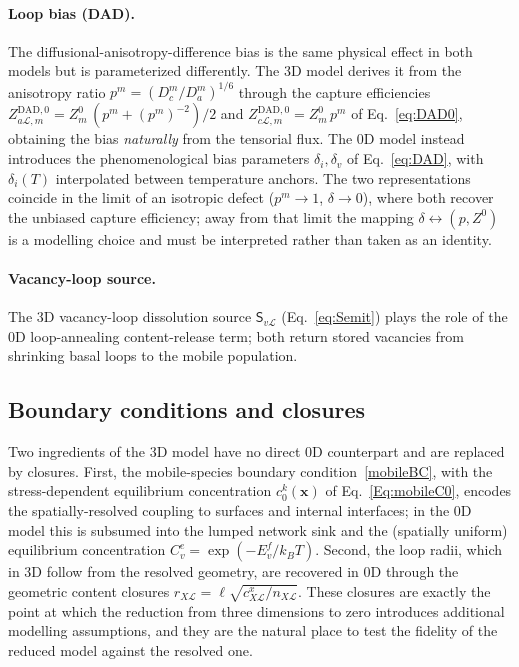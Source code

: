 \documentclass{article}
\newcommand{\spvec}[1]{\bm{\mathsf{#1}}}   %
\begin{document}
\paragraph{Loop bias (DAD).} The diffusional-anisotropy-difference bias is the same physical effect in both models but is parameterized differently. The 3D model derives it from the anisotropy ratio $p^m=(D_c^m/D_a^m)^{1/6}$ through the capture efficiencies $Z^{\mathrm{DAD},0}_{a\mathcal L,m}=Z^0_m\,(p^m+(p^m)^{-2})/2$ and $Z^{\mathrm{DAD},0}_{c\mathcal L,m}=Z^0_m\,p^m$ of Eq.~\eqref{eq:DAD0}, obtaining the bias \emph{naturally} from the tensorial flux. The 0D model instead introduces the phenomenological bias parameters $\delta_i,\delta_v$ of Eq.~\eqref{eq:DAD}, with $\delta_i(T)$ interpolated between temperature anchors. The two representations coincide in the limit of an isotropic defect ($p^m\to1$, $\delta\to0$), where both recover the unbiased capture efficiency; away from that limit the mapping $\delta \leftrightarrow (p,Z^0)$ is a modelling choice and must be interpreted rather than taken as an identity.

\paragraph{Vacancy-loop source.} The 3D vacancy-loop dissolution source $\spvec{S}_{v\mathcal L}$ (Eq.~\eqref{eq:Semit}) plays the role of the 0D loop-annealing content-release term; both return stored vacancies from shrinking basal loops to the mobile population.

\subsection{Boundary conditions and closures}
Two ingredients of the 3D model have no direct 0D counterpart and are replaced by closures. First, the mobile-species boundary condition~\eqref{mobileBC}, with the stress-dependent equilibrium concentration $c^k_0(\bm x)$ of Eq.~\eqref{Eq:mobileC0}, encodes the spatially-resolved coupling to surfaces and internal interfaces; in the 0D model this is subsumed into the lumped network sink and the (spatially uniform) equilibrium concentration $C_v^e=\exp(-E_v^f/k_BT)$. Second, the loop radii, which in 3D follow from the resolved geometry, are recovered in 0D through the geometric content closures $r_{X\mathcal L}=\ell\sqrt{c^x_{X\mathcal L}/n_{X\mathcal L}}$. These closures are exactly the point at which the reduction from three dimensions to zero introduces additional modelling assumptions, and they are the natural place to test the fidelity of the reduced model against the resolved one.
\end{document}
